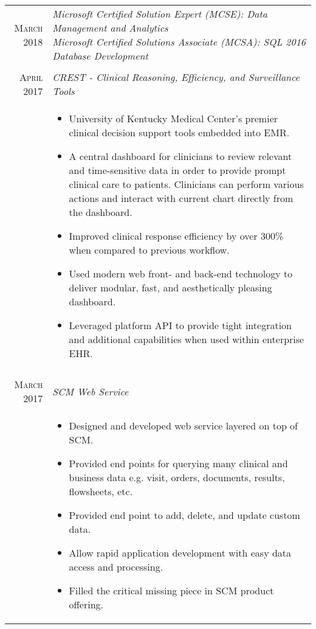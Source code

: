 \documentclass[letter,11pt,DIV=20]{scrartcl}
\begin{document}
\begin{tabu}{r|X}


   \textsc{March 2018} & \emph{Microsoft Certified Solution Expert (MCSE): Data Management and Analytics \newline
   Microsoft Certified Solutions Associate (MCSA): SQL 2016 Database Development} \\

   \\  

   \textsc{April 2017} & \emph{CREST - Clinical Reasoning, Efficiency, and Surveillance Tools}
   \\ &{\small\vspace{-0.5em} 
  \begin{itemize}[topsep=0pt,nosep,noitemsep,leftmargin=1em]
       \item University of Kentucky Medical Center's premier clinical decision support tools embedded into EMR.
       \item A central dashboard for clinicians to review relevant and time-sensitive data in order to provide prompt clinical care to patients. Clinicians can perform various actions and interact with current chart directly from the dashboard.
       \item Improved clinical response efficiency by over 300\% when compared to previous workflow.
       \item Used modern web front- and back-end technology to deliver modular, fast, and aesthetically pleasing dashboard.
       \item Leveraged platform API to provide tight integration and additional capabilities when used within enterprise EHR.
  \end{itemize}} \\ 

   \\  
  
   \textsc{March 2017} & \emph{SCM Web Service}
   \\ &{\small\vspace{-0.5em} 
  \begin{itemize}[topsep=0pt,nosep,noitemsep,leftmargin=1em]
       \item Designed and developed web service layered on top of SCM.
       \item Provided end points for querying many clinical and business data e.g. visit, orders, documents, results, flowsheets, etc.
       \item Provided end point to add, delete, and update custom data. 
       \item Allow rapid application development with easy data access and processing.
       \item Filled the critical missing piece in SCM product offering.
  \end{itemize}} \\   
  

\end{tabu}
\end{document}
